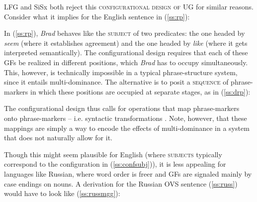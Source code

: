 \documentclass[output=paper,hidelinks]{langscibook}
\begin{document}
LFG and SiSx both reject this \textsc{configurational design of UG} for similar reasons. Consider what it implies for the English sentence in (\ref{ss:rp}): %

\begin{exe}
\label{ss:rp}
\end{exe}

In (\ref{ss:rp}), \textit{Brad} behaves like the \textsc{subject} of two predicates: the one headed by \textit{seem} (where it establishes agreement) and the one headed by \textit{like} (where it gets interpreted semantically). The configurational design requires that each of these GFs be realized in different positions, which \textit{Brad} has to occupy simultaneously.  This, however, is technically impossible in a typical phrase-structure system, since it entails multi-dominance. The alternative is to posit a \textsc{sequence} of phrase-markers in which these positions are occupied at separate stages, as in (\ref{ss:drp}):

\begin{exe} 
\label{ss:drp}
\end{exe}

The configurational design thus calls for operations that map phrase-markers onto phrase-markers -- i.e. syntactic transformations \citep[44]{chomsky1957syntactic}. Note, however, that these mappings are simply a way to encode the effects of multi-dominance in a system that does not naturally allow for it. 

Though this might seem plausible for English (where \textsc{subjects} typically correspond to the configuration in (\ref{ss:confsubj})), it is less appealing for languages like Russian, where word order is freer and GFs are signaled mainly by case endings on nouns. A derivation for the Russian OVS sentence (\ref{ss:russ}) would have to look like (\ref{ss:russmgg}):
\end{document}
